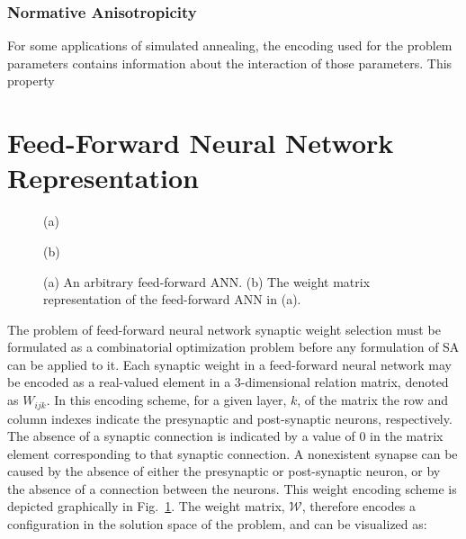 \documentclass[11pt]{afthesis}
\begin{document}
	\subsubsection{Normative Anisotropicity}
	
	For some applications of simulated annealing, the encoding used for the problem parameters contains information about the interaction of those parameters. This property
	
	
	\section{Feed-Forward Neural Network Representation}
	\label{scn:feed_forward_neural_network_representation}
	\begin{figure}
		
		\begin{minipage}[b]{0.48\linewidth}
			\centering
			\centerline{}
			\centerline{(a)}\medskip
		\end{minipage}
		\hfill
		\begin{minipage}[b]{0.48\linewidth}
			\centering
			\centerline{}
			\centerline{(b)}\medskip
		\end{minipage}
		\caption{
			(a) An arbitrary feed-forward ANN.
			(b) The weight matrix representation of the feed-forward ANN in (a).}
		\label{fig:nettomatmapping}
	\end{figure}
	
	 The problem of feed-forward neural network synaptic weight selection must be formulated as a combinatorial optimization problem before any formulation of SA can be applied to it. Each synaptic weight in a feed-forward neural network may be encoded as a real-valued element in a 3-dimensional relation matrix, denoted as $\mathit{W}_{ijk}$. In this encoding scheme, for a given layer, $k$, of the matrix the row and column indexes indicate the presynaptic and post-synaptic neurons, respectively. The absence of a synaptic connection is indicated by a value of $0$ in the matrix element corresponding to that synaptic connection. A nonexistent synapse can be caused by the absence of either the presynaptic or post-synaptic neuron, or by the absence of a connection between the neurons. This weight encoding scheme is depicted graphically in Fig.~\ref{fig:nettomatmapping}. The weight matrix, $\boldsymbol{\mathcal{W}}$, therefore encodes a configuration in the solution space of the problem, and can be visualized as:
	 
\end{document}

